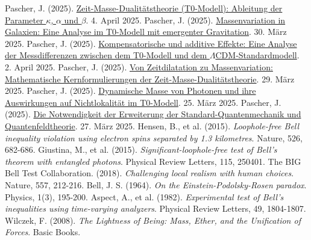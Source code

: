 \documentclass[a4paper,12pt]{article}
\theoremstyle{definition}
\theoremstyle{remark}
\begin{document}
	\begin{thebibliography}{99}
		 Pascher, J. (2025). \href{https://github.com/jpascher/T0-Time-Mass-Duality/tree/main/2/pdf/Deutsch/ZeitMasseT0Params.pdf}{Zeit-Masse-Dualitätstheorie (T0-Modell): Ableitung der Parameter \(\kappa\), \(\alpha\) und \(\beta\)}. 4. April 2025.
		 Pascher, J. (2025). \href{https://github.com/jpascher/T0-Time-Mass-Duality/tree/main/2/pdf/Deutsch/MassVarGalaxien.pdf}{Massenvariation in Galaxien: Eine Analyse im T0-Modell mit emergenter Gravitation}. 30. März 2025.
		 Pascher, J. (2025). \href{https://github.com/jpascher/T0-Time-Mass-Duality/tree/main/2/pdf/Deutsch/MessdifferenzenT0Standard.pdf}{Kompensatorische und additive Effekte: Eine Analyse der Messdifferenzen zwischen dem T0-Modell und dem \(\Lambda\)CDM-Standardmodell}. 2. April 2025.
		 Pascher, J. (2025). \href{https://github.com/jpascher/T0-Time-Mass-Duality/tree/main/2/pdf/Deutsch/MathZeitMasseLagrange.pdf}{Von Zeitdilatation zu Massenvariation: Mathematische Kernformulierungen der Zeit-Masse-Dualitätstheorie}. 29. März 2025.
		 Pascher, J. (2025). \href{https://github.com/jpascher/T0-Time-Mass-Duality/tree/main/2/pdf/Deutsch/DynMassePhotonenNichtlokal.pdf}{Dynamische Masse von Photonen und ihre Auswirkungen auf Nichtlokalität im T0-Modell}. 25. März 2025.
		 Pascher, J. (2025). \href{https://github.com/jpascher/T0-Time-Mass-Duality/tree/main/2/pdf/Deutsch/NotwendigkeitQMErweiterung.pdf}{Die Notwendigkeit der Erweiterung der Standard-Quantenmechanik und Quantenfeldtheorie}. 27. März 2025.
		 Hensen, B., et al. (2015). \textit{Loophole-free Bell inequality violation using electron spins separated by 1.3 kilometres}. Nature, 526, 682-686.
		 Giustina, M., et al. (2015). \textit{Significant-loophole-free test of Bell’s theorem with entangled photons}. Physical Review Letters, 115, 250401.
		 The BIG Bell Test Collaboration. (2018). \textit{Challenging local realism with human choices}. Nature, 557, 212-216.
		 Bell, J. S. (1964). \textit{On the Einstein-Podolsky-Rosen paradox}. Physics, 1(3), 195-200.
		 Aspect, A., et al. (1982). \textit{Experimental test of Bell's inequalities using time-varying analyzers}. Physical Review Letters, 49, 1804-1807.
		 Wilczek, F. (2008). \textit{The Lightness of Being: Mass, Ether, and the Unification of Forces}. Basic Books.

\end{thebibliography}
\end{document}
